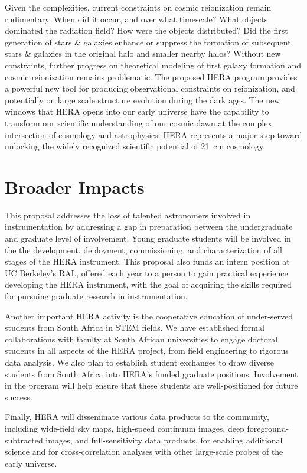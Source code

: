 \documentclass[preprint]{aastex}
\begin{document}
Given the complexities, current constraints on cosmic reionization remain rudimentary. When did it
occur, and over what timescale?  What objects dominated the radiation field?
How were the objects distributed? Did the first generation of stars \& galaxies
enhance or suppress the formation of subsequent stars \& galaxies in the
original halo and smaller nearby halos? Without new constraints, further
progress on theoretical modeling of first galaxy formation and cosmic
reionization remains problematic.  The proposed HERA program provides a
powerful new tool for producing observational constraints on reionization, and
potentially on large scale structure evolution during the dark ages.  The new
windows that HERA opens into our early universe have the capability to
transform our scientific understanding of our cosmic dawn at the complex intersection of cosmology
and astrophysics.  HERA represents a major step toward unlocking the widely recognized scientific potential of
21~cm cosmology.

\section*{Broader Impacts}

This proposal addresses the loss of talented astronomers involved in
instrumentation by addressing a gap in preparation between the undergraduate
and graduate level of involvement.  Young graduate students will be involved
in the the development,
deployment, commissioning, and characterization of all stages of the HERA
instrument. This proposal also funds an intern
position at UC Berkeley's RAL, offered each year to a person to gain
practical experience developing
the HERA instrument, with the goal of acquiring the skills required for
pursuing graduate research in instrumentation.

Another important HERA activity is the cooperative education of
under-served students from South Africa in STEM fields.
We have established formal collaborations
with faculty at South African universities to engage doctoral students in all aspects of the HERA project, from
field engineering to rigorous data analysis. We also plan to establish
student exchanges to draw
diverse students from South Africa into HERA's funded graduate positions.
Involvement in the
program will help ensure that these students are well-positioned for
future success.

Finally, HERA will disseminate various data products to the community,
including wide-field sky maps, high-speed continuum images, deep
foreground-subtracted images, and full-sensitivity data products, for enabling
additional science and for cross-correlation analyses with other large-scale
probes of the early universe.
\end{document}
